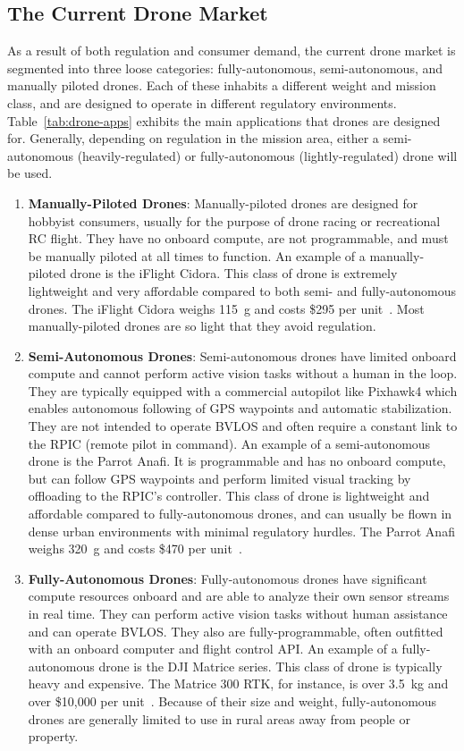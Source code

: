 \subsection{The Current Drone Market}
\label{sec:current-market}
As a result of both regulation and consumer demand, the current drone market is segmented into three loose categories: fully-autonomous, semi-autonomous, and manually piloted drones. Each of these inhabits a different weight and mission class, and are designed to operate in different regulatory environments. Table~\ref{tab:drone-apps} exhibits the main applications that drones are designed for. Generally, depending on regulation in the mission area, either a semi-autonomous (heavily-regulated) or fully-autonomous (lightly-regulated) drone will be used. 

\begin{enumerate}
    \item \textbf{Manually-Piloted Drones}: Manually-piloted drones are designed for hobbyist consumers, usually for the purpose of drone racing or recreational RC flight. They have no onboard compute, are not programmable, and must be manually piloted at all times to function. An example of a manually-piloted drone is the iFlight Cidora. This class of drone is extremely lightweight and very affordable compared to both semi- and fully-autonomous drones. The iFlight Cidora weighs 115~g and costs \$295 per unit~\cite{Cidora}. Most manually-piloted drones are so light that they avoid regulation.
    \\
    \item \textbf{Semi-Autonomous Drones}: Semi-autonomous drones have limited onboard compute and cannot perform active vision tasks without a human in the loop. They are typically equipped with a commercial autopilot like Pixhawk4 which enables autonomous following of GPS waypoints and automatic stabilization. They are not intended to operate BVLOS and often require a constant link to the RPIC (remote pilot in command). An example of a semi-autonomous drone is the Parrot Anafi. It is programmable and has no onboard compute, but can follow GPS waypoints and perform limited visual tracking by offloading to the RPIC's controller. This class of drone is lightweight and affordable compared to fully-autonomous drones, and can usually be flown in dense urban environments with minimal regulatory hurdles. The Parrot Anafi weighs 320~g and costs \$470 per unit~\cite{ParrotAnafi}.
    \\
    \item \textbf{Fully-Autonomous Drones}: Fully-autonomous drones have significant compute resources onboard and are able to analyze their own sensor streams in real time. They can perform active vision tasks without human assistance and can operate BVLOS. They also are fully-programmable, often outfitted with an onboard computer and flight control API. An example of a fully-autonomous drone is the DJI Matrice series. This class of drone is typically heavy and expensive. The Matrice 300 RTK, for instance, is over 3.5~kg and over \$10,000 per unit~\cite{Matrice300RTK}. Because of their size and weight, fully-autonomous drones are generally limited to use in rural areas away from people or property.
    \\
\end{enumerate}
